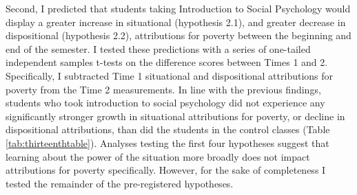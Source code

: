 \documentclass{sfuthesis}
\begin{document}
Second, I predicted that students taking Introduction to Social Psychology would display a greater increase in situational (hypothesis 2.1), and greater decrease in dispositional (hypothesis 2.2), attributions for poverty between the beginning and end of the semester. I tested these predictions with a series of one-tailed independent samples t-tests on the difference scores between Times 1 and 2. Specifically, I subtracted Time 1 situational and dispositional attributions for poverty from the Time 2 measurements. In line with the previous findings, students who took introduction to social psychology did not experience any significantly stronger growth in situational attributions for poverty, or decline in dispositional attributions, than did the students in the control classes (Table \ref{tab:thirteenthtable}). Analyses testing the first four hypotheses suggest that learning about the power of the situation more broadly does not impact attributions for poverty specifically. However, for the sake of completeness I tested the remainder of the pre-registered hypotheses.
\end{document}
